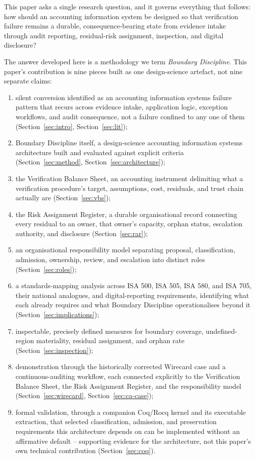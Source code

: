 \documentclass[11pt,a4paper]{article}
\theoremstyle{definition}
\theoremstyle{remark}
\begin{document}
This paper asks a single research question, and it governs everything that follows: how should an accounting information system be designed so that verification failure remains a durable, consequence-bearing state from evidence intake through audit reporting, residual-risk assignment, inspection, and digital disclosure?

The answer developed here is a methodology we term \emph{Boundary Discipline}. This paper's contribution is nine pieces built as one design-science artefact, not nine separate claims:

\begin{enumerate}
\item silent conversion identified as an accounting information systems failure pattern that recurs across evidence intake, application logic, exception workflows, and audit consequence, not a failure confined to any one of them (Section~\ref{sec:intro}, Section~\ref{sec:lit});
\item Boundary Discipline itself, a design-science accounting information systems architecture built and evaluated against explicit criteria (Section~\ref{sec:method}, Section~\ref{sec:architecture});
\item the Verification Balance Sheet, an accounting instrument delimiting what a verification procedure's target, assumptions, cost, residuals, and trust chain actually are (Section~\ref{sec:vbs});
\item the Risk Assignment Register, a durable organisational record connecting every residual to an owner, that owner's capacity, orphan status, escalation authority, and disclosure (Section~\ref{sec:rar});
\item an organisational responsibility model separating proposal, classification, admission, ownership, review, and escalation into distinct roles (Section~\ref{sec:roles});
\item a standards-mapping analysis across ISA 500, ISA 505, ISA 580, and ISA 705, their national analogues, and digital-reporting requirements, identifying what each already requires and what Boundary Discipline operationalises beyond it (Section~\ref{sec:implications});
\item inspectable, precisely defined measures for boundary coverage, undefined-region materiality, residual assignment, and orphan rate (Section~\ref{sec:inspection});
\item demonstration through the historically corrected Wirecard case and a continuous-auditing workflow, each connected explicitly to the Verification Balance Sheet, the Risk Assignment Register, and the responsibility model (Section~\ref{sec:wirecard}, Section~\ref{sec:ca-case});
\item formal validation, through a companion Coq/Rocq kernel and its executable extraction, that selected classification, admission, and preservation requirements this architecture depends on can be implemented without an affirmative default -- supporting evidence for the architecture, not this paper's own technical contribution (Section~\ref{sec:coq}).
\end{enumerate}
\end{document}
